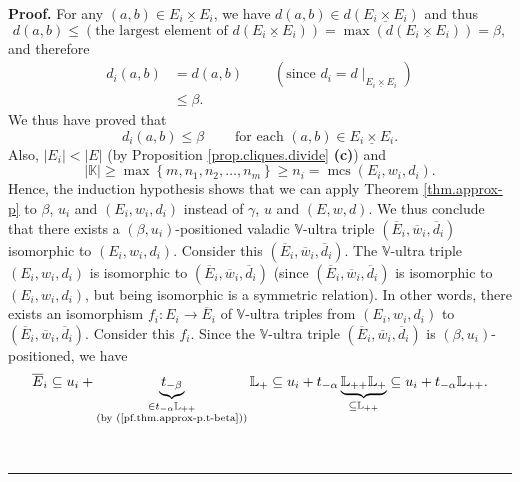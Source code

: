 \documentclass[numbers=enddot,12pt,final,onecolumn,notitlepage]{scrartcl}%
\theoremstyle{definition}
\newenvironment{proof}[1][Proof]{\noindent\textbf{#1.} }{\ \rule{0.5em}{0.5em}}
\newcommand{\timesu}{\mathbin{\underline{\times}}}
\renewcommand{\leq}{\leqslant}
\renewcommand{\geq}{\geqslant}
\theoremstyle{plainsl}
\begin{document}
\begin{proof}
For any $\left(  a,b\right)  \in E_{i}\timesu E_{i}$, we have $d\left(
a,b\right)  \in d\left(  E_{i}\timesu E_{i}\right)  $ and thus%
\[
d\left(  a,b\right)  \leq\left(  \text{the largest element of }d\left(
E_{i}\timesu E_{i}\right)  \right)  =\max\left(  d\left(  E_{i}\timesu
E_{i}\right)  \right)  =\beta,
\]
and therefore%
\begin{align*}
d_{i}\left(  a,b\right)    & =d\left(  a,b\right)  \ \ \ \ \ \ \ \ \ \ \left(
\text{since }d_{i}=d\mid_{E_{i}\timesu E_{i}}\right)  \\
& \leq\beta.
\end{align*}
We thus have proved that%
\[
d_{i}\left(  a,b\right)  \leq\beta\ \ \ \ \ \ \ \ \ \ \text{for each }\left(
a,b\right)  \in E_{i}\timesu E_{i}.
\]
Also, $\left\vert E_{i}\right\vert <\left\vert E\right\vert $ (by Proposition
\ref{prop.cliques.divide} \textbf{(c)}) and%
\[
\left\vert \mathbb{K}\right\vert \geq\max\left\{  m,n_{1},n_{2},\ldots
,n_{m}\right\}  \geq n_{i}=\operatorname*{mcs}\left(  E_{i},w_{i}%
,d_{i}\right)  .
\]
Hence, the induction hypothesis shows that we can apply Theorem
\ref{thm.approx-p} to $\beta$, $u_{i}$ and $\left(  E_{i},w_{i},d_{i}\right)
$ instead of $\gamma$, $u$ and $\left(  E,w,d\right)  $. We thus conclude that
there exists a $\left(  \beta,u_{i}\right)  $-positioned valadic $\mathbb{V}%
$-ultra triple $\left(  \overline{E}_{i},\overline{w}_{i},\overline{d}%
_{i}\right)  $ isomorphic to $\left(  E_{i},w_{i},d_{i}\right)  $. Consider
this $\left(  \overline{E}_{i},\overline{w}_{i},\overline{d}_{i}\right)  $.
The $\mathbb{V}$-ultra triple $\left(  E_{i},w_{i},d_{i}\right)  $ is
isomorphic to $\left(  \overline{E}_{i},\overline{w}_{i},\overline{d}%
_{i}\right)  $ (since $\left(  \overline{E}_{i},\overline{w}_{i},\overline
{d}_{i}\right)  $ is isomorphic to $\left(  E_{i},w_{i},d_{i}\right)  $, but
being isomorphic is a symmetric relation). In other words, there exists an
isomorphism $f_{i}:E_{i}\rightarrow\overline{E}_{i}$ of $\mathbb{V}$-ultra
triples from $\left(  E_{i},w_{i},d_{i}\right)  $ to $\left(  \overline{E}%
_{i},\overline{w}_{i},\overline{d}_{i}\right)  $. Consider this $f_{i}$. Since
the $\mathbb{V}$-ultra triple $\left(  \overline{E}_{i},\overline{w}%
_{i},\overline{d}_{i}\right)  $ is $\left(  \beta,u_{i}\right)  $-positioned,
we have%
\[
\overline{E}_{i}\subseteq u_{i}+\underbrace{t_{-\beta}}_{\substack{\in
t_{-\alpha}\mathbb{L}_{++}\\\text{(by (\ref{pf.thm.approx-p.t-beta}))}%
}}\mathbb{L}_{+}\subseteq u_{i}+t_{-\alpha}\underbrace{\mathbb{L}%
_{++}\mathbb{L}_{+}}_{\subseteq\mathbb{L}_{++}}\subseteq u_{i}+t_{-\alpha
}\mathbb{L}_{++}.
\]



\end{proof}
\end{document}
